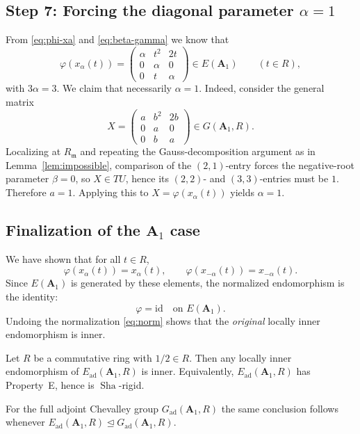 \documentclass[]{jgcc}
\numberwithin{equation}{section}
\newcommand{\Sha}{\operatorname{Sha}}
\begin{document}
\subsection*{\texorpdfstring{Step 7: Forcing the diagonal parameter $\alpha=1$}{Step 7: Forcing the diagonal parameter alpha=1}}
From \eqref{eq:phi-xa} and \eqref{eq:beta-gamma} we know that
\[
\varphi(x_\alpha(t))=
\begin{pmatrix}
\alpha& t^2& 2t\\
0& \alpha& 0\\
0& t& \alpha
\end{pmatrix}\in E(\mathbf A_1)\qquad(t\in R),
\]
with $3\alpha=3$. We claim that necessarily $\alpha=1$.
Indeed, consider the general matrix
\[
X=\begin{pmatrix}
a& b^2& 2b\\
0& a& 0\\
0& b& a
\end{pmatrix}\in G(\mathbf A_1,R).
\]
Localizing at $R_{\mathfrak m}$ and repeating the Gauss-decomposition argument as in Lemma~\ref{lem:impossible},
comparison of the $(2,1)$-entry forces the negative-root parameter $\beta=0$, so $X\in TU$,
hence its $(2,2)$- and $(3,3)$-entries must be $1$. Therefore $a=1$.
Applying this to $X=\varphi(x_\alpha(t))$ yields $\alpha=1$.

\subsection*{\texorpdfstring{Finalization of the $\mathbf A_1$ case}{Finalization of the A1 case}}
We have shown that for all $t\in R$,
\[
\varphi(x_\alpha(t))=x_\alpha(t),\qquad \varphi(x_{-\alpha}(t))=x_{-\alpha}(t).
\]
Since $E(\mathbf A_1)$ is generated by these elements, the normalized endomorphism is the identity:
\[
\varphi=\mathrm{id}\quad\text{on }E(\mathbf A_1).
\]
Undoing the normalization \eqref{eq:norm} shows that the \emph{original} locally inner endomorphism is inner.

\begin{thm}\label{thm:A1}
Let $R$ be a commutative ring with $1/2\in R$. Then any locally inner endomorphism of
$E_{\mathrm{ad}}(\mathbf A_1,R)$ is inner. Equivalently, $E_{\mathrm{ad}}(\mathbf A_1,R)$ has Property~E, hence is $\Sha$-rigid.
\end{thm}

\begin{rem}
For the full adjoint Chevalley group $G_{\mathrm{ad}}(\mathbf A_1,R)$ the same conclusion follows whenever
$E_{\mathrm{ad}}(\mathbf A_1,R)\trianglelefteq G_{\mathrm{ad}}(\mathbf A_1,R)$.
\end{rem}
\end{document}
